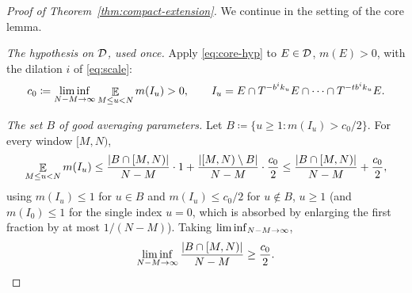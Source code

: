 \begin{proof}[Proof of Theorem~\ref{thm:compact-extension}]
  \leanok
  We continue in the setting of the core lemma.

  \emph{The hypothesis on $\mathcal{D}$, used once.}  Apply \eqref{eq:core-hyp} to $E \in \mathcal{D}$,
  $m(E) > 0$, with the dilation $i$ of \eqref{eq:scale}:
  \begin{equation}
    \label{eq:c0}
    c_0 \coloneqq \liminf_{N-M \to \infty} \mathop{\mathbb{E}}_{M \leq u < N} m(I_u) > 0 , \qquad
    I_u = E \cap T^{-b^i k_u}E \cap \cdots \cap T^{-t b^i k_u}E .
  \end{equation}

  \emph{The set $B$ of good averaging parameters.}  Let
  $B \coloneqq \{u \geq 1 : m(I_u) > c_0/2\}$.  For every window $[M,N)$,
  \[
    \mathop{\mathbb{E}}_{M \leq u < N} m(I_u)
      \leq \frac{\lvert B \cap [M,N) \rvert}{N-M}\cdot 1 + \frac{\lvert [M,N) \setminus B \rvert}{N-M}\cdot\frac{c_0}{2}
      \leq \frac{\lvert B \cap [M,N) \rvert}{N-M} + \frac{c_0}{2} ,
  \]
  using $m(I_u) \leq 1$ for $u \in B$ and $m(I_u) \leq c_0/2$ for $u \notin B$, $u \geq 1$ (and
  $m(I_0) \leq 1$ for the single index $u = 0$, which is absorbed by enlarging the first
  fraction by at most $1/(N-M)$).  Taking $\liminf_{N-M \to \infty}$,
  \begin{equation}
    \label{eq:B-density}
    \liminf_{N-M \to \infty} \frac{\lvert B \cap [M,N) \rvert}{N-M} \geq \frac{c_0}{2} .
  \end{equation}


\end{proof}
